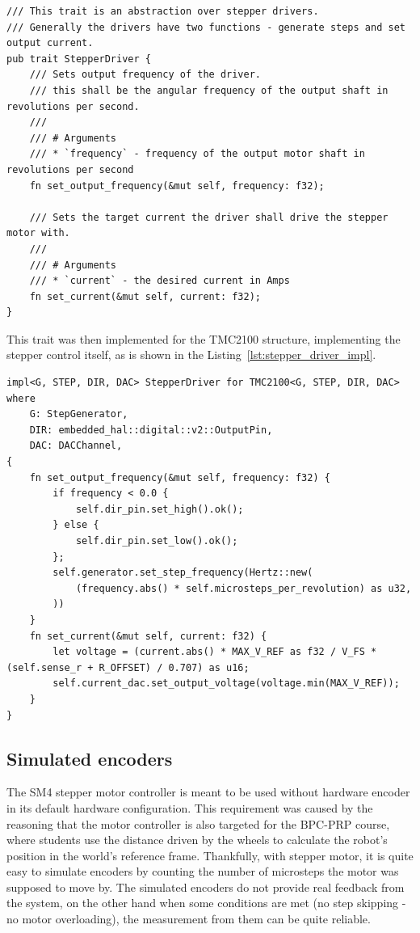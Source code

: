 \begin{lstlisting}[caption={Trait for abstracting the stepper motor driver IC.},label=lst:stepper_driver_trait]
/// This trait is an abstraction over stepper drivers.
/// Generally the drivers have two functions - generate steps and set output current.
pub trait StepperDriver {
    /// Sets output frequency of the driver.
    /// this shall be the angular frequency of the output shaft in revolutions per second.
    ///
    /// # Arguments
    /// * `frequency` - frequency of the output motor shaft in revolutions per second
    fn set_output_frequency(&mut self, frequency: f32);

    /// Sets the target current the driver shall drive the stepper motor with.
    ///
    /// # Arguments
    /// * `current` - the desired current in Amps
    fn set_current(&mut self, current: f32);
}
\end{lstlisting}

This trait was then implemented for the TMC2100 structure, implementing the stepper control itself, as is shown in the Listing~\ref{lst:stepper_driver_impl}.

\begin{lstlisting}[caption={Implementing the StepperDriver trait for TMC2100.},label=lst:stepper_driver_impl]
impl<G, STEP, DIR, DAC> StepperDriver for TMC2100<G, STEP, DIR, DAC>
where
    G: StepGenerator,
    DIR: embedded_hal::digital::v2::OutputPin,
    DAC: DACChannel,
{
    fn set_output_frequency(&mut self, frequency: f32) {
        if frequency < 0.0 {
            self.dir_pin.set_high().ok();
        } else {
            self.dir_pin.set_low().ok();
        };
        self.generator.set_step_frequency(Hertz::new(
            (frequency.abs() * self.microsteps_per_revolution) as u32,
        ))
    }
    fn set_current(&mut self, current: f32) {
        let voltage = (current.abs() * MAX_V_REF as f32 / V_FS * (self.sense_r + R_OFFSET) / 0.707) as u16;
        self.current_dac.set_output_voltage(voltage.min(MAX_V_REF));
    }
}
\end{lstlisting}

\subsection{Simulated encoders}
\label{subsec:simulated_encoders}
The SM4 stepper motor controller is meant to be used without hardware encoder in its default hardware configuration.
This requirement was caused by the reasoning that the motor controller is also targeted for the BPC-PRP course, where students use the distance driven by the wheels to calculate the robot's position in the world's reference frame.
Thankfully, with stepper motor, it is quite easy to simulate encoders by counting the number of microsteps the motor was supposed to move by.
The simulated encoders do not provide real feedback from the system, on the other hand when some conditions are met (no step skipping - no motor overloading), the measurement from them can be quite reliable.

